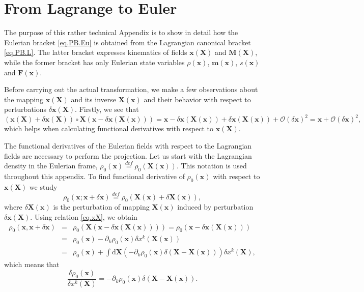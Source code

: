 \documentclass[
10pt, %
a4paper, %
oneside, %
headinclude,footinclude, %
BCOR5mm, %
]{scrartcl}
\newcommand{\xx}{\mathbf{x}}
\newcommand{\XX}{\mathbf{X}}
\newcommand{\dX}{\mathrm{d}\XX}
\newcommand{\mm}{\mathbf{m}}
\newcommand{\MM}{\mathbf{M}}
\newcommand{\OBig}{\mathcal{O}}
\newcommand{\FF}{\mathbf{F}}
\begin{document}
\section{From Lagrange to Euler}\label{sec.L-E}
The purpose of this rather technical Appendix is to show in detail how the Eulerian bracket \eqref{eq.PB.Eu} is obtained from the Lagrangian canonical bracket \eqref{eq.PB.L}. The latter bracket expresses kinematics of fields $\xx(\XX)$ and $\MM(\XX)$, while the former bracket has only Eulerian state variables $\rho(\xx)$, $\mm(\xx)$, $s(\xx)$ and $\FF(\xx)$.

Before carrying out the actual transformation, we make a few observations about the mapping $\xx(\XX)$ and its inverse $\XX(\xx)$ and their behavior with respect to perturbations $\delta \xx(\XX)$. Firstly, we see that
\begin{equation}\label{eq.xX}
	(\xx(\XX) + \delta\xx(\XX))\circ \XX(\xx-\delta \xx(\XX(\xx))) = \xx -\delta\xx(\XX(\xx)) + \delta\xx(\XX(\xx)) + \OBig(\delta\xx)^2
= \xx + \OBig(\delta\xx)^2,
\end{equation}
which helps when calculating functional derivatives with respect to $\xx(\XX)$.

The functional derivatives of the Eulerian fields with respect to the Lagrangian fields are necessary to perform the projection. Let us start with the Lagrangian density in the Eulerian frame, $\rho_0(\xx)\stackrel{def}{=}\rho_0(\XX(\xx))$. This notation is used throughout this appendix. To find functional derivative of $\rho_0(\xx)$ with respect to $\xx(\XX)$ we study 
\begin{equation}
	\rho_0(\xx;\xx+\delta\xx)\stackrel{def}{=} \rho_0(\XX(\xx)+\delta\XX(\xx)),
\end{equation}
where $\delta\XX(\xx)$ is the perturbation of mapping $\XX(\xx)$ induced by perturbation $\delta\xx(\XX)$. Using relation \eqref{eq.xX}, we obtain 
\begin{eqnarray}
	\rho_0(\xx,\xx+\delta\xx) &=& \rho_0(\XX(\xx-\delta\xx(\XX(\xx)))) = \rho_0(\xx-\delta\xx(\XX(\xx)))\nonumber\\
	&=&\rho_0(\xx)-\partial_k \rho_0(\xx) \delta x^k(\XX(\xx))\nonumber\\
	&=&\rho_0(\xx)+\int\dX \left(-\partial_k \rho_0(\xx) \delta(\XX-\XX(\xx))\right)\delta x^k(\XX),
\end{eqnarray}
which means that
\begin{equation}\label{eq.rho0x}
	\frac{\delta \rho_0(\xx)}{\delta x^k(\XX)} = -\partial_k \rho_0(\xx) \delta(\XX-\XX(\xx)).
\end{equation}
\end{document}

